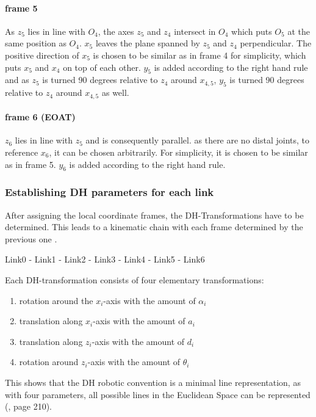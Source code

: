 \paragraph{frame 5}
As $z_5$ lies  in line with $O_4$, the axes  $z_5$ and $z_4$ intersect in $O_4$ which puts $O_5$ at the same position as $O_4$.
$x_5$ leaves the plane spanned by  $z_5$ and $z_4$ perpendicular.
The positive direction of $x_5$ is chosen to be similar as in frame 4 for simplicity, which puts $x_5$ and $x_4$ on top of each other. 
$y_5$ is added according to the right hand rule and as $z_5$ is turned 90 degrees relative to $z_4$ around $x_{4,5}$, $y_5$ is turned 90 degrees relative to $z_4$ around $x_{4,5}$ as well.

\paragraph{frame 6 (EOAT)}
$z_6$ lies in line with $z_5$ and is consequently parallel.
as there are no distal joints, to reference $x_6$, it can be chosen arbitrarily. 
For simplicity, it is chosen to be similar as in frame 5. 
$y_6$ is added according to the right hand rule.

\subsubsection{Establishing \ac{DH} parameters for each link}

After assigning the local coordinate frames, the \ac{DH}-Transformations have to be determined. This leads to a kinematic chain with each frame determined by the previous one \cite{DenavitHartenbergKonventionen}.

Link0 - Link1 - Link2 - Link3 - Link4 - Link5 - Link6

Each \ac{DH}-transformation consists of four elementary transformations\cite{DenavitHartenbergKonventionen}:

\begin{enumerate}[label=\emph{\arabic*)}]
	\item rotation around the $x_i$-axis with the amount of $\alpha_i$
	\item translation along $x_i$-axis with the amount of  $a_i$
	\item translation along $z_i$-axis with the amount of  $d_i$
	\item rotation around $z_i$-axis with the amount of  $\theta_i$
\end{enumerate}

This shows that the \ac{DH} robotic convention is a minimal line representation, as with four parameters, all possible lines in the Euclidean Space can be represented (\cite{AutRobVeh}, page 210).

